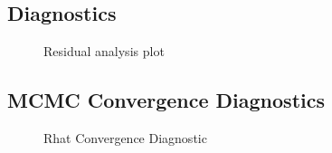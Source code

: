 \documentclass[
  letterpaper,
  DIV=11,
  numbers=noendperiod]{scrartcl}
\begin{document}
\subsection{Diagnostics}\label{diagnostics}

\begin{figure}[H]


\caption{\label{fig-residuals}Residual analysis plot}

\end{figure}%

\subsection{MCMC Convergence
Diagnostics}\label{mcmc-convergence-diagnostics}

\begin{figure}[H]


\caption{\label{fig-mcmc-convergence}Rhat Convergence Diagnostic}

\end{figure}%
\end{document}
